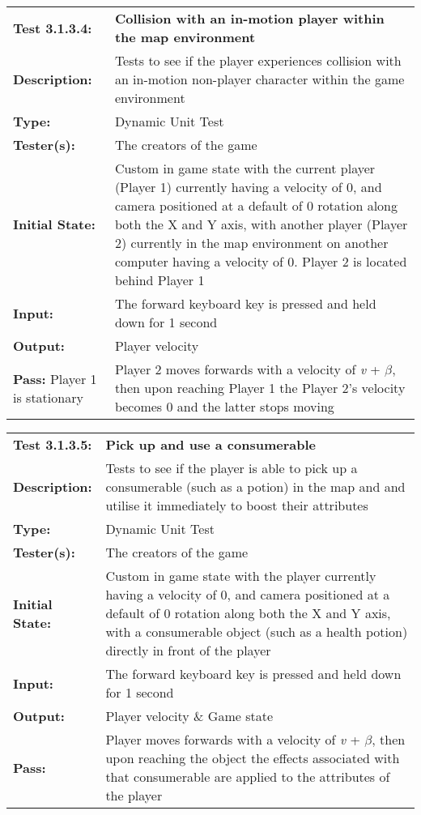 \documentclass[12pt, titlepage]{article}
\begin{document}
\begin{mdframed}[linewidth=1pt]
\begin{tabularx}{\textwidth}{@{}p{3cm}X@{}}
{\bf Test 3.1.3.4:} & {\bf Collision with an in-motion player within the map environment}\\[\baselineskip]
{\bf Description:} & Tests to see if the player experiences collision with an in-motion non-player character within the game environment\\[0.5\baselineskip]
{\bf Type:} & Dynamic Unit Test\\[0.5\baselineskip]
{\bf Tester(s):} & The creators of the game\\[0.5\baselineskip]
{\bf Initial State:} & Custom in game state with the current player (Player 1) currently having a velocity of 0, and camera positioned at a default of 0 rotation along both the X and Y axis, with another player (Player 2) currently in the map environment on another computer  having a velocity of 0. Player 2 is located behind Player 1\\[0.5\baselineskip]
{\bf Input:} & The forward keyboard key is pressed and held down for 1 second \\[0.5\baselineskip]
{\bf Output:} & Player velocity\\[0.5\baselineskip]
{\bf Pass:} Player 1 is stationary & Player 2 moves forwards with a velocity of \textit{v} + $\beta$, then upon reaching Player 1 the Player 2's velocity becomes 0 and the latter stops moving
\end{tabularx}
\end{mdframed}

\begin{mdframed}[linewidth=1pt]
\begin{tabularx}{\textwidth}{@{}p{3cm}X@{}}
{\bf Test 3.1.3.5:} & {\bf Pick up and use a consumerable}\\[\baselineskip]
{\bf Description:} & Tests to see if the player is able to pick up a consumerable (such as a potion) in the map and and utilise it immediately to boost their attributes\\[0.5\baselineskip]
{\bf Type:} & Dynamic Unit Test\\[0.5\baselineskip]
{\bf Tester(s):} & The creators of the game\\[0.5\baselineskip]
{\bf Initial State:} & Custom in game state with the player currently having a velocity of 0, and camera positioned at a default of 0 rotation along both the X and Y axis, with a consumerable object (such as a health potion) directly in front of the player\\[0.5\baselineskip]
{\bf Input:} & The forward keyboard key is pressed and held down for 1 second \\[0.5\baselineskip]
{\bf Output:} & Player velocity \& Game state\\[0.5\baselineskip]
{\bf Pass:} & Player moves forwards with a velocity of \textit{v} + $\beta$, then upon reaching the object the effects associated with that consumerable are applied to the attributes of the player 
\end{tabularx}
\end{mdframed}
\newpage
\end{document}
